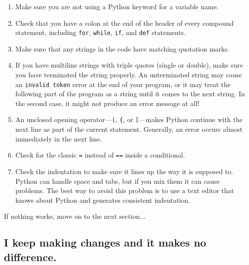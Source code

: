 \documentclass[10pt]{book}
\begin{document}
\begin{enumerate}

\item Make sure you are not using a Python keyword for a variable name.


\item Check that you have a colon at the end of the header of every
compound statement, including {\tt for}, {\tt while},
{\tt if}, and {\tt def} statements.


\item Make sure that any strings in the code have matching
quotation marks.


\item If you have multiline strings with triple quotes (single or double), make
sure you have terminated the string properly.  An unterminated string
may cause an {\tt invalid token} error at the end of your program,
or it may treat the following part of the program as a string until it
comes to the next string.  In the second case, it might not produce an error
message at all!


\item An unclosed opening operator---\verb+(+, \verb+{+, or
  \verb+[+---makes Python continue with the next line as part of the
  current statement.  Generally, an error occurs almost immediately in
  the next line.

\item Check for the classic {\tt =} instead of {\tt ==} inside
a conditional.


\item Check the indentation to make sure it lines up the way it
is supposed to.  Python can handle space and tabs, but if you mix
them it can cause problems.  The best way to avoid this problem
is to use a text editor that knows about Python and generates
consistent indentation.


\end{enumerate}

If nothing works, move on to the next section...


\subsection{I keep making changes and it makes no difference.}
\end{document}
